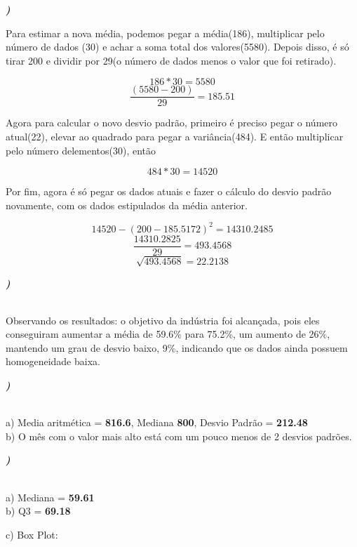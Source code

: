 \documentclass[12pt]{article}
\newcounter{instn}
\newcommand{\instnum}{\arabic{instn}}
\newcommand{\myline}[1]{
    \emph{\textbf{#1)}}
    \addtocounter{instn}{1}
}
\begin{document}
    \myline{\instnum} Para estimar a nova média, podemos pegar a média(186), multiplicar pelo número de dados (30)
    e achar a soma total dos valores(5580). Depois disso, é só tirar 200 e dividir por 29(o número de dados menos o
    valor que foi retirado).

        \[186 * 30 = 5580\]
        \[\frac{(5580 - 200)}{29} = 185.51\]

    Agora para calcular o novo desvio padrão, primeiro é preciso pegar o número atual(22), elevar ao quadrado 
    para pegar a variância(484). E então multiplicar pelo número delementos(30), então 

        \[484 * 30 = 14520\] 

    Por fim, agora é só pegar os dados atuais e fazer o cálculo do desvio padrão novamente, com os dados estipulados 
    da média anterior.

        \[14520 - (200 - 185.5172)^2 = 14310.2485\]
        \[\frac{14310.2825}{29} = 493.4568\]
        \[\sqrt{493.4568} = 22.2138\]

    \myline{\instnum} \\ Observando os resultados: o objetivo da indústria foi alcançada, pois eles conseguiram aumentar
    a média de 59.6\% para 75.2\%, um aumento de 26\%, mantendo um grau de desvio baixo, 9\%, indicando que os dados
    ainda possuem homogeneidade baixa.


    \myline{\instnum} \\ a) Media aritmética = \textbf{816.6}, Mediana \textbf{800}, Desvio Padrão = \textbf{212.48}
    \\ b) O mês com o valor mais alto está com um pouco menos de 2 desvios padrões.


    \myline{\instnum} \\ a) Mediana = \textbf{59.61} \\ b) Q3 = \textbf{69.18}

    c) Box Plot: 
    \begin{center}
    \end{center}
\end{document}
